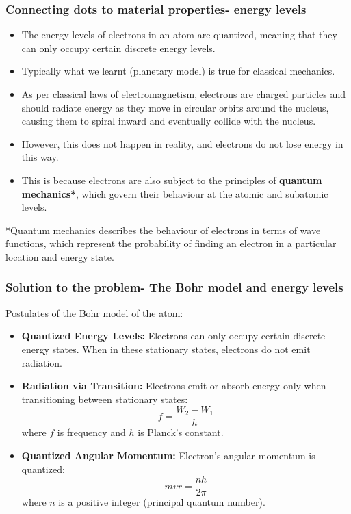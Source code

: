 \begin{frame}
	\frametitle{Connecting dots to material properties- energy levels}
    \begin{itemize}
        \item The energy levels of electrons in an atom are quantized, meaning that they can only occupy certain discrete energy levels.
        \item Typically what we learnt (planetary model) is true for classical mechanics.
        \item As per classical laws of electromagnetism, electrons are charged particles and should radiate energy as they move in circular orbits around the nucleus, causing them to spiral inward and eventually collide with the nucleus.
        \item However, this does not happen in reality, and electrons do not lose energy in this way.
        \item This is because electrons are also subject to the principles of \textbf{quantum mechanics*}, which govern their behaviour at the atomic and subatomic levels.
    \end{itemize}
{\footnotesize{*Quantum mechanics describes the behaviour of electrons in terms of wave functions, which represent the probability of finding an electron in a particular location and energy state.}}
\end{frame}

\begin{frame}
	\frametitle{Solution to the problem- The Bohr model and energy levels}
    Postulates of the Bohr model of the atom:
    \begin{itemize}
        \item \textbf{Quantized Energy Levels:} Electrons can only occupy certain discrete energy states. When in these stationary states, electrons do not emit radiation.

        \item \textbf{Radiation via Transition:} Electrons emit or absorb energy only when transitioning between stationary states:
        \begin{equation}
        f = \frac{W_2 - W_1}{h}
        \end{equation}
        where $f$ is frequency and $h$ is Planck's constant.

        \item \textbf{Quantized Angular Momentum:} Electron's angular momentum is quantized:
        \begin{equation} \label{eq:angular_momentum}
        mvr = \frac{nh}{2\pi}
        \end{equation}
        where $n$ is a positive integer (principal quantum number).
    \end{itemize}
\end{frame}

